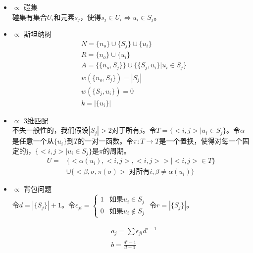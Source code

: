 \documentclass[twocolumn]{article}
\theoremstyle{nonumberplain}%
\begin{document}
\begin{CJK}{UTF8}{gbsn}
\begin{itemize}
    \item { $\propto$ 碰集}\\
        碰集有集合$U_i$和元素$s_j$，使得$s_j\in U_i\Leftrightarrow u_i\in S_j$。

    \item { $\propto$ 斯坦纳树}
        \begin{equation}\nonumber %
        \begin{aligned}
        &N=\{n_o\}\cup\{S_j\}\cup\{u_i\}\\
        &R=\{n_o\}\cup\{u_i\}\\
        &A=\{\{n_o,S_j\}\}\cup\{\{S_j,u_i\}|u_i\in S_j\}\\
        &w(\{n_o,S_j\})=|S_j|\\
        &w(\{S_j,u_i\})=0\\
        &k=|\{u_i\}|
        \end{aligned}
        \end{equation}

    \item { $\propto$ 3维匹配}\\
        不失一般性的，我们假设$|S_j|>2$对于所有$j$。令$T=\{<i,j>|u_i\in S_j\}$。令$\alpha$是任意一个从$\{u_i\}$到$T$的一对一函数。令$\pi:T\rightarrow T$是一个置换，使得对每一个固定的j，$\{<i,j>|u_i\in S_j\}$是$\pi$的周期。
        \begin{equation}\nonumber %
        \begin{aligned}
        U=&\{<\alpha(u_i),<i,j>,<i,j>>|<i,j>\in T\}\\
          &\cup\{<\beta,\sigma,\pi(\sigma)>|\text{对所有}i,\beta\neq \alpha(u_i)\}
        \end{aligned}
        \end{equation}

    \item { $\propto$ 背包问题}\\
        令$d=|\{S_j\}|+1$。令$\epsilon_{ji}=
        \left\{\begin{matrix}
            1 & \text{如果}u_i\in S_j \\
            0 & \text{如果}u_i\notin S_j
        \end{matrix}\right.$ 令$r=|\{S_j\}|$。

        \begin{equation}\nonumber %
        \begin{aligned}
        &a_j=\sum\epsilon_{ji}d^{i-1}\\
        &b=\frac{d^t-1}{d-1}
        \end{aligned}
        \end{equation}


\end{itemize}
\end{CJK}
\end{document}
